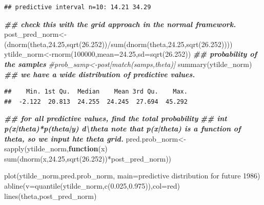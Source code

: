 \documentclass[
]{book}
\newenvironment{Shaded}{\begin{snugshade}}{\end{snugshade}}
\newcommand{\AttributeTok}[1]{\textcolor[rgb]{0.77,0.63,0.00}{#1}}
\newcommand{\CommentTok}[1]{\textcolor[rgb]{0.56,0.35,0.01}{\textit{#1}}}
\newcommand{\ControlFlowTok}[1]{\textcolor[rgb]{0.13,0.29,0.53}{\textbf{#1}}}
\newcommand{\DecValTok}[1]{\textcolor[rgb]{0.00,0.00,0.81}{#1}}
\newcommand{\DocumentationTok}[1]{\textcolor[rgb]{0.56,0.35,0.01}{\textbf{\textit{#1}}}}
\newcommand{\FloatTok}[1]{\textcolor[rgb]{0.00,0.00,0.81}{#1}}
\newcommand{\FunctionTok}[1]{\textcolor[rgb]{0.00,0.00,0.00}{#1}}
\newcommand{\NormalTok}[1]{#1}
\newcommand{\OtherTok}[1]{\textcolor[rgb]{0.56,0.35,0.01}{#1}}
\newcommand{\SpecialCharTok}[1]{\textcolor[rgb]{0.00,0.00,0.00}{#1}}
\newcommand{\StringTok}[1]{\textcolor[rgb]{0.31,0.60,0.02}{#1}}
\theoremstyle{definition}
\theoremstyle{definition}
\theoremstyle{definition}
\theoremstyle{definition}
\theoremstyle{remark}
\begin{document}
\begin{verbatim}
## predictive interval n=10: 14.21 34.29
\end{verbatim}

\begin{Shaded}
\begin{Highlighting}[]
   \DocumentationTok{\#\# check this with the grid approach in the normal framework.  }
\NormalTok{  post\_pred\_norm}\OtherTok{\textless{}{-}}\NormalTok{(}\FunctionTok{dnorm}\NormalTok{(theta,}\FloatTok{24.25}\NormalTok{,}\FunctionTok{sqrt}\NormalTok{(}\FloatTok{26.252}\NormalTok{))}\SpecialCharTok{/}\FunctionTok{sum}\NormalTok{(}\FunctionTok{dnorm}\NormalTok{(theta,}\FloatTok{24.25}\NormalTok{,}\FunctionTok{sqrt}\NormalTok{(}\FloatTok{26.252}\NormalTok{))))}
\NormalTok{   ytilde\_norm}\OtherTok{\textless{}{-}}\FunctionTok{rnorm}\NormalTok{(}\DecValTok{100000}\NormalTok{,}\AttributeTok{mean=}\FloatTok{24.25}\NormalTok{,}\AttributeTok{sd=}\FunctionTok{sqrt}\NormalTok{(}\FloatTok{26.252}\NormalTok{)) }
 \DocumentationTok{\#\# probability of the samples }
 \CommentTok{\#prob\_samp\textless{}{-}post[match(samps,theta)]}
  \FunctionTok{summary}\NormalTok{(ytilde\_norm) }\DocumentationTok{\#\# we have a wide distribution of predictive values.}
\end{Highlighting}
\end{Shaded}

\begin{verbatim}
##    Min. 1st Qu.  Median    Mean 3rd Qu.    Max. 
##  -2.122  20.813  24.255  24.245  27.694  45.292
\end{verbatim}

\begin{Shaded}
\begin{Highlighting}[]
\DocumentationTok{\#\# for all predictive values,  find the total probability  }
   \DocumentationTok{\#\# int p(x|theta)*p(theta|y) d\textbackslash{}theta  note that p(x|theta) is a function of theta, so we input hte theta grid.}
\NormalTok{ pred.prob\_norm}\OtherTok{\textless{}{-}}\FunctionTok{sapply}\NormalTok{(ytilde\_norm,}\ControlFlowTok{function}\NormalTok{(x) }\FunctionTok{sum}\NormalTok{(}\FunctionTok{dnorm}\NormalTok{(x,}\FloatTok{24.25}\NormalTok{,}\FunctionTok{sqrt}\NormalTok{(}\FloatTok{26.252}\NormalTok{))}\SpecialCharTok{*}\NormalTok{post\_pred\_norm))  }
  
 \FunctionTok{plot}\NormalTok{(ytilde\_norm,pred.prob\_norm, }\AttributeTok{main=}\StringTok{\textquotesingle{}predictive distribution for future 1986\textquotesingle{}}\NormalTok{)}
 \FunctionTok{abline}\NormalTok{(}\AttributeTok{v=}\FunctionTok{quantile}\NormalTok{(ytilde\_norm,}\FunctionTok{c}\NormalTok{(}\FloatTok{0.025}\NormalTok{,}\FloatTok{0.975}\NormalTok{)),}\AttributeTok{col=}\StringTok{\textquotesingle{}red\textquotesingle{}}\NormalTok{)}
 \FunctionTok{lines}\NormalTok{(theta,post\_pred\_norm)}
\end{Highlighting}
\end{Shaded}
\end{document}
